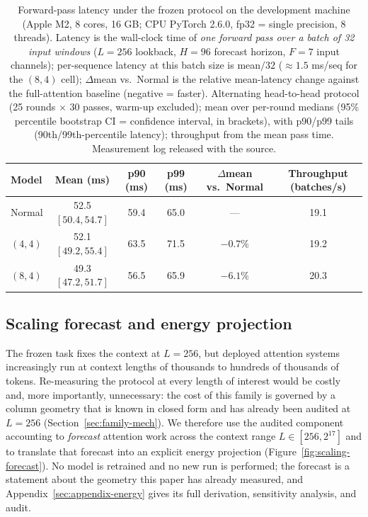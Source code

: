 \begin{table}[t]
\centering
\small
\caption{Forward-pass latency under the frozen protocol on the development
machine (Apple M2, 8 cores, 16 GB; CPU PyTorch 2.6.0, fp32 = single
precision, 8 threads).
Latency is the wall-clock time of \emph{one forward pass over a batch of 32
input windows} ($L{=}256$ lookback, $H{=}96$ forecast horizon, $F{=}7$
input channels); per-sequence latency at this
batch size is mean$/32$ (${\approx}1.5$ ms/seq for the $(8,4)$ cell);
$\Delta$mean vs.\ Normal is the relative mean-latency change against the
full-attention baseline (negative = faster). Alternating
head-to-head protocol (25 rounds $\times$ 30 passes, warm-up excluded);
mean over per-round medians (95\% percentile bootstrap CI = confidence
interval, in brackets), with
p90/p99 tails (90th/99th-percentile latency); throughput from the mean pass time. Measurement log released
with the source.}
\label{tab:speed}
\begin{tabular}{lccccc}
\toprule
Model & Mean (ms) & p90 (ms) & p99 (ms) & $\Delta$mean vs.\ Normal & Throughput (batches/s) \\
\midrule
Normal & 52.5 $[50.4, 54.7]$ & 59.4 & 65.0 & --- & 19.1 \\
$(4,4)$ & 52.1 $[49.2, 55.4]$ & 63.5 & 71.5 & $-0.7\%$ & 19.2 \\
$(8,4)$ & 49.3 $[47.2, 51.7]$ & 56.5 & 65.9 & $-6.1\%$ & 20.3 \\
\bottomrule
\end{tabular}
\end{table}

\subsection{Scaling forecast and energy projection}
\label{sec:forecast}

The frozen task fixes the context at $L{=}256$, but deployed attention
systems increasingly run at context lengths of thousands to hundreds of
thousands of tokens. Re-measuring the protocol at every length of interest
would be costly and, more importantly, unnecessary: the cost of this
family is governed by a column geometry that is known in closed form and
has already been audited at $L{=}256$ (Section~\ref{sec:family-mech}).
We therefore use the audited component accounting to \emph{forecast}
attention work across the context range $L \in [256, 2^{17}]$ and to
translate that forecast into an explicit energy projection
(Figure~\ref{fig:scaling-forecast}). No model is retrained and no new run
is performed; the forecast is a statement about the geometry this paper
has already measured, and Appendix~\ref{sec:appendix-energy} gives its
full derivation, sensitivity analysis, and audit.

